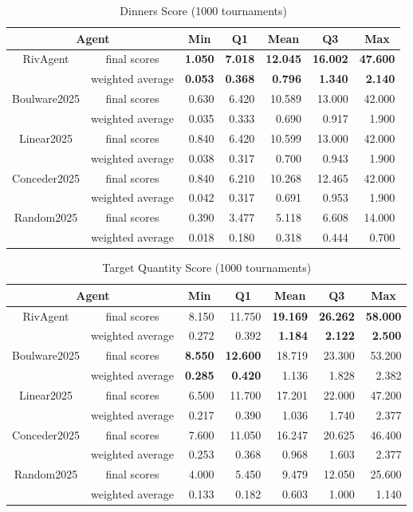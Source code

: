 \documentclass{article}
\begin{document}
\begin{table}[htbp]
	\centering
	\caption{Dinners Score (1000 tournaments)}
	\label{tb:dinners-score}
	\begin{tabular}{|c|c|r|r|r|r|r|}\hline
		\multicolumn{2}{|c|}{Agent}&\multicolumn{1}{c|}{Min}&\multicolumn{1}{c|}{Q1}&\multicolumn{1}{c|}{Mean}&\multicolumn{1}{c|}{Q3}&\multicolumn{1}{c|}{Max}\\\hline
		RivAgent&final scores&\textbf{1.050}&\textbf{7.018}&\textbf{12.045}&\textbf{16.002}&\textbf{47.600}\\\cline{2-7}
		&weighted average&\textbf{0.053}&\textbf{0.368}&\textbf{0.796}&\textbf{1.340}&\textbf{2.140}\\\hline
		Boulware2025&final scores&0.630&6.420&10.589&13.000&42.000\\\cline{2-7}
		&weighted average&0.035&0.333&0.690&0.917&1.900\\\hline
		Linear2025&final scores&0.840&6.420&10.599&13.000&42.000\\\cline{2-7}
		&weighted average&0.038&0.317&0.700&0.943&1.900\\\hline
		Conceder2025&final scores&0.840&6.210&10.268&12.465&42.000\\\cline{2-7}
		&weighted average&0.042&0.317&0.691&0.953&1.900\\\hline
		Random2025&final scores&0.390&3.477&5.118&6.608&14.000\\\cline{2-7}
		&weighted average&0.018&0.180&0.318&0.444&0.700\\\hline
	\end{tabular}
\end{table}
\begin{table}[H]
	\centering
	\caption{Target Quantity Score (1000 tournaments)}
	\label{tb:tq-score}
	\begin{tabular}{|c|c|r|r|r|r|r|}\hline
		\multicolumn{2}{|c|}{Agent}&\multicolumn{1}{c|}{Min}&\multicolumn{1}{c|}{Q1}&\multicolumn{1}{c|}{Mean}&\multicolumn{1}{c|}{Q3}&\multicolumn{1}{c|}{Max}\\\hline
		RivAgent&final scores&8.150&11.750&\textbf{19.169}&\textbf{26.262}&\textbf{58.000}\\\cline{2-7}
		&weighted average&0.272&0.392&\textbf{1.184}&\textbf{2.122}&\textbf{2.500}\\\hline
		Boulware2025&final scores&\textbf{8.550}&\textbf{12.600}&18.719&23.300&53.200\\\cline{2-7}
		&weighted average&\textbf{0.285}&\textbf{0.420}&1.136&1.828&2.382\\\hline
		Linear2025&final scores&6.500&11.700&17.201&22.000&47.200\\\cline{2-7}
		&weighted average&0.217&0.390&1.036&1.740&2.377\\\hline
		Conceder2025&final scores&7.600&11.050&16.247&20.625&46.400\\\cline{2-7}
		&weighted average&0.253&0.368&0.968&1.603&2.377\\\hline
		Random2025&final scores&4.000&5.450&9.479&12.050&25.600\\\cline{2-7}
		&weighted average&0.133&0.182&0.603&1.000&1.140\\\hline
	\end{tabular}
\end{table}
\end{document}
